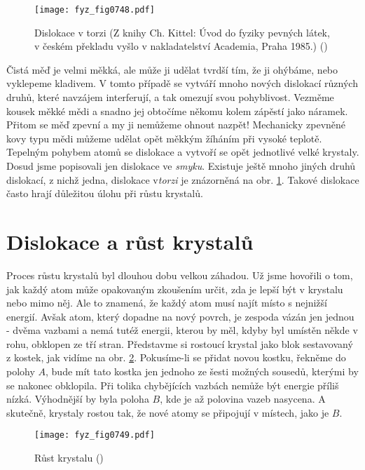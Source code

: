     \begin{figure}[ht!] %
      \centering
      \texttt{[image: fyz\_fig0748.pdf]}
      \caption{Dislokace v torzi (Z knihy Ch. Kittel: Úvod do fyziky pevných látek, v českém 
               překladu vyšlo v nakladatelství Academia, Praha 1985.)
               (\cite[s.~554]{Feynman02})}
      \label{fyz:fig0748}
    \end{figure}
    
    Čistá měď je velmi měkká, ale může ji udělat tvrdší tím, že ji ohýbáme, nebo vyklepeme 
    kladivem. V tomto případě se vytváří mnoho nových dislokací různých druhů, které navzájem 
    interferují, a tak omezují svou pohyblivost. Vezměme kousek měkké mědi a snadno jej obtočíme 
    někomu kolem zápěstí jako náramek. Přitom se měď zpevní a my ji nemůžeme ohnout nazpět! 
    Mechanicky zpevněné kovy typu mědi můžeme udělat opět měkkým žíháním při vysoké teplotě. 
    Tepelným pohybem atomů se  dislokace a vytvoří se opět jednotlivé velké krystaly. 
    Dosud jsme popisovali jen dislokace ve \emph{smyku}. Existuje ještě mnoho jiných druhů 
    dislokací, z nichž jedna, dislokace v\emph{torzi} je znázorněná na obr. \ref{fyz:fig0748}. 
    Takové dislokace často hrají důležitou úlohu při růstu krystalů. 
    
  \section{Dislokace a růst krystalů}\label{fyz:IIchapXXXsecVIII}
    Proces růstu krystalů byl dlouhou dobu velkou záhadou. Už jsme hovořili o tom, jak každý atom 
    může opakovaným zkoušením určit, zda je lepší být v krystalu nebo mimo něj. Ale to znamená, že 
    každý atom musí najít místo s nejnižší energií. Avšak atom, který dopadne na nový povrch, je 
    zespoda vázán jen jednou - dvěma vazbami a nemá tutéž energii, kterou by měl, kdyby byl umístěn 
    někde v rohu, obklopen ze tří stran. Představme si rostoucí krystal jako blok sestavovaný z 
    kostek, jak vidíme na obr. \ref{fyz:fig0749}. Pokusíme-li se přidat novou kostku, řekněme do 
    polohy \(A\), bude mít tato kostka jen jednoho ze šesti možných sousedů, kterými by se nakonec 
    obklopila. Při tolika chybějících vazbách nemůže být energie příliš nízká. Výhodnější by byla 
    poloha \(B\), kde je až polovina vazeb nasycena. A skutečně, krystaly rostou tak, že nové atomy 
    se připojují v místech, jako je \(B\).
    
    \begin{figure}[ht!] %
      \centering
      \texttt{[image: fyz\_fig0749.pdf]}
      \caption{Růst krystalu
               (\cite[s.~555]{Feynman02})}
      \label{fyz:fig0749}
    \end{figure}

